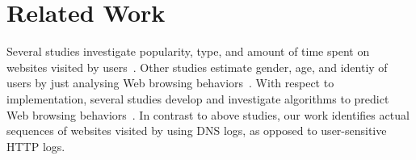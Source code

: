 \documentclass[letterpaper,twocolumn]{article}
\begin{document}
\vspace{-15pt}
\section{Related Work}
\label{sec:related_work}
\vspace{-8pt}

Several studies investigate popularity, type, and amount of time spent on websites visited by users~\cite{BighamCBWL07,export:176481,Huang:2010:PBB:1810617.1810622,montgomery2000trends}.
Other studies estimate gender, age, and identiy of users by just analysing Web browsing behaviors~\cite{275,canali2014effectiveness,Hu:2007:DPB:1242572.1242594,kakkarweb}.
With respect to implementation, several studies develop and investigate algorithms to predict Web browsing behaviors~\cite{awad2012prediction,dongre2015improved,scott2006nested,shiryayev1992markov,zhu2005behavior}.
In contrast to above studies, our work identifies actual sequences of websites visited by using DNS logs, as opposed to user-sensitive HTTP logs.
\end{document}
